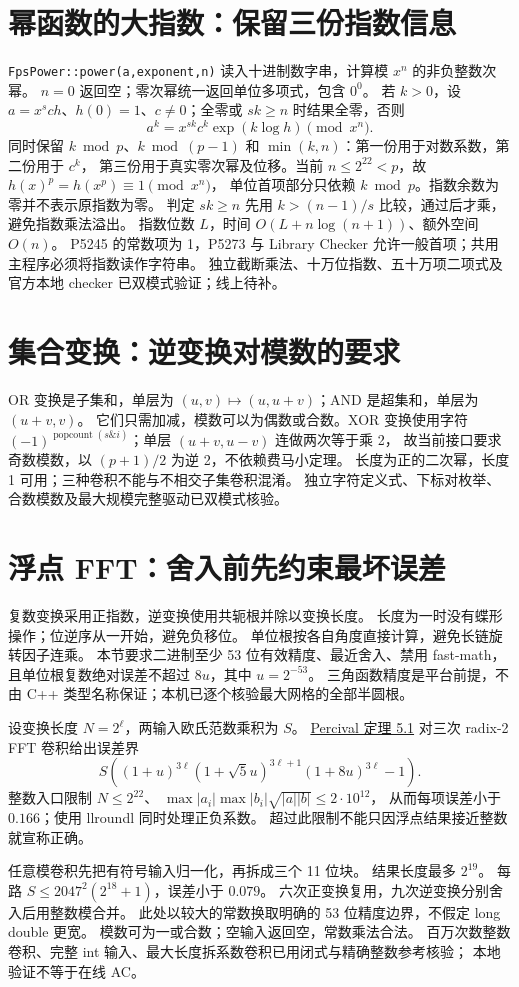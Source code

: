 \section{幂函数的大指数：保留三份指数信息}\label{knowledge-poly-power}
\texttt{FpsPower::power(a,exponent,n)} 读入十进制数字串，计算模 $x^n$ 的非负整数次幂。
$n=0$ 返回空；零次幂统一返回单位多项式，包含 $0^0$。
若 $k>0$，设 $a=x^sc h$、$h(0)=1$、$c\ne0$；全零或 $sk\ge n$ 时结果全零，否则
\[
 a^k=x^{sk}c^k\exp(k\log h)\pmod{x^n}.
\]
同时保留 $k\bmod p$、$k\bmod(p-1)$ 和 $\min(k,n)$：第一份用于对数系数，第二份用于 $c^k$，
第三份用于真实零次幂及位移。当前 $n\le2^{22}<p$，故 $h(x)^p=h(x^p)\equiv1\pmod{x^n}$，
单位首项部分只依赖 $k\bmod p$。指数余数为零并不表示原指数为零。
判定 $sk\ge n$ 先用 $k>(n-1)/s$ 比较，通过后才乘，避免指数乘法溢出。
指数位数 $L$，时间 $O(L+n\log(n+1))$、额外空间 $O(n)$。
P5245 的常数项为 1，P5273 与 Library Checker 允许一般首项；共用主程序必须将指数读作字符串。
独立截断乘法、十万位指数、五十万项二项式及官方本地 checker 已双模式验证；线上待补。
\section{集合变换：逆变换对模数的要求}\label{knowledge-fwt-inverse}
OR 变换是子集和，单层为 $(u,v)\mapsto(u,u+v)$；AND 是超集和，单层为 $(u+v,v)$。
它们只需加减，模数可以为偶数或合数。XOR 变换使用字符
$(-1)^{\operatorname{popcount}(s\mathbin{\&}i)}$；单层 $(u+v,u-v)$ 连做两次等于乘 2，
故当前接口要求奇数模数，以 $(p+1)/2$ 为逆 2，不依赖费马小定理。
长度为正的二次幂，长度 1 可用；三种卷积不能与不相交子集卷积混淆。
独立字符定义式、下标对枚举、合数模数及最大规模完整驱动已双模式核验。
\section{浮点 FFT：舍入前先约束最坏误差}\label{knowledge-float-fft}
复数变换采用正指数，逆变换使用共轭根并除以变换长度。
长度为一时没有蝶形操作；位逆序从一开始，避免负移位。
单位根按各自角度直接计算，避免长链旋转因子连乘。
本节要求二进制至少 53 位有效精度、最近舍入、禁用 fast-math，
且单位根复数绝对误差不超过 $8u$，其中 $u=2^{-53}$。
三角函数精度是平台前提，不由 C++ 类型名称保证；本机已逐个核验最大网格的全部半圆根。

设变换长度 $N=2^\ell$，两输入欧氏范数乘积为 $S$。
\href{https://www.daemonology.net/papers/fft.pdf}{Percival 定理 5.1}
对三次 radix-2 FFT 卷积给出误差界
\[
 S\left((1+u)^{3\ell}(1+\sqrt5u)^{3\ell+1}
 (1+8u)^{3\ell}-1\right).
\]
整数入口限制 $N\le2^{22}$、
$\max|a_i|\max|b_i|\sqrt{|a||b|}\le2\cdot10^{12}$，
从而每项误差小于 $0.166$；使用 llroundl 同时处理正负系数。
超过此限制不能只因浮点结果接近整数就宣称正确。

任意模卷积先把有符号输入归一化，再拆成三个 11 位块。
结果长度最多 $2^{19}$。
每路 $S\le2047^2(2^{18}+1)$，误差小于 $0.079$。
六次正变换复用，九次逆变换分别舍入后用整数模合并。
此处以较大的常数换取明确的 53 位精度边界，不假定 long double 更宽。
模数可为一或合数；空输入返回空，常数乘法合法。
百万次数整数卷积、完整 int 输入、最大长度拆系数卷积已用闭式与精确整数参考核验；
本地验证不等于在线 AC。
